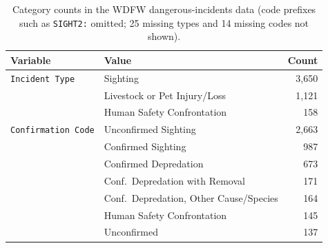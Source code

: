 \documentclass[11pt, a4paper]{article}
\begin{document}
\begin{table}[!htb]
  \centering
  \caption{Category counts in the WDFW dangerous-incidents data (code prefixes such as \texttt{SIGHT2:} omitted; 25 missing types and 14 missing codes not shown).}
  \label{tab:wdfw-summary}
  \begin{tabular}{@{}llr@{}}
    \toprule
    Variable & Value                                   & Count \\
    \midrule
    \texttt{Incident Type}
             & Sighting                                & 3,650 \\
             & Livestock or Pet Injury/Loss            & 1,121 \\
             & Human Safety Confrontation              & 158   \\
    \midrule
    \texttt{Confirmation Code}
             & Unconfirmed Sighting                    & 2,663 \\
             & Confirmed Sighting                      & 987   \\
             & Confirmed Depredation                   & 673   \\
             & Conf.\ Depredation with Removal         & 171   \\
             & Conf.\ Depredation, Other Cause/Species & 164   \\
             & Human Safety Confrontation              & 145   \\
             & Unconfirmed                             & 137   \\
    \bottomrule
  \end{tabular}
\end{table}
\end{document}
